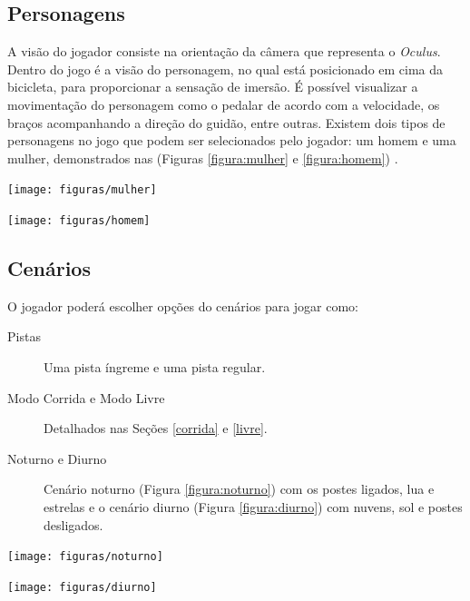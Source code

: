 \subsection{Personagens}
A visão do jogador consiste na orientação da câmera que representa o \textit{Oculus}. Dentro do jogo é a visão do personagem, no qual está posicionado em cima da bicicleta, para proporcionar a sensação de imersão. É possível visualizar a movimentação do personagem como o pedalar de acordo com a velocidade, os braços acompanhando a direção do guidão, entre outras. Existem dois tipos de personagens no jogo que podem ser selecionados pelo jogador: um homem e uma mulher, demonstrados nas (Figuras \ref{figura:mulher} e \ref{figura:homem}) .

\begin{center}
	\texttt{[image: figuras/mulher]}
	\label{figura:mulher}
\end{center}

\begin{center}
	\texttt{[image: figuras/homem]}
	\label{figura:homem}
\end{center}

\subsection{Cenários}

O jogador poderá escolher opções do cenários para jogar como:

\begin{description}
\item[Pistas] Uma pista íngreme e uma pista regular.
\item[Modo Corrida e Modo Livre] Detalhados nas Seções \ref{corrida} e \ref{livre}.
\item[Noturno e Diurno] Cenário noturno (Figura \ref{figura:noturno}) com os postes ligados, lua e estrelas e o cenário diurno (Figura \ref{figura:diurno}) com nuvens, sol e postes desligados.
\end{description}

\begin{center}
	\texttt{[image: figuras/noturno]}
	\label{figura:noturno}
\end{center}

\begin{center}
	\texttt{[image: figuras/diurno]}
	\label{figura:diurno}
\end{center}

